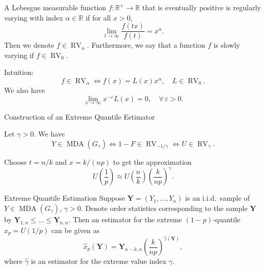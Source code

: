 \documentclass[11pt, aspectratio=169]{beamer}
\DeclareMathOperator{\mda}{MDA}
\DeclareMathOperator{\rv}{RV}
\begin{document}

\begin{frame}
  \begin{definition}
    A Lebesgue measurable function $f:\mathbb{R}^+\to\mathbb{R}$ that is
    eventually positive is regularly varying with index $\alpha\in\mathbb{R}$ if
    for all $x > 0$,
    \begin{equation*}
      \lim_{t\to\infty}\frac{f\left(tx\right)}{f\left(t\right)} = x^\alpha.
    \end{equation*}
    Then we denote $f\in \rv_\alpha$. Furthermore, we say that a function $f$ is
    slowly varying if $f\in \rv_0$.
  \end{definition}
  \pause
  Intuition:
  \begin{equation*}
    f\in\rv_\alpha \iff f(x) = L(x)x^{\alpha}, \quad L\in\rv_0.
  \end{equation*}
  We also have
  \begin{equation*}
    \lim_{x\to\infty} x^{-\varepsilon} L(x) = 0, \quad\forall
    \, \varepsilon > 0.
  \end{equation*}
\end{frame}


\begin{frame}{Construction of an Extreme Quantile Estimator}
  \begin{theorem}
    Let $\gamma > 0$. We have
    \begin{equation*}
      Y\in\mda\left(G_\gamma\right) \iff 1-F\in \rv_{-1/\gamma}
      \iff U\in \rv_\gamma.
    \end{equation*}
    \pause
  \end{theorem}
  Choose $t=n/k$ and $x = k/(np)$ to get the approximation
    \begin{equation*}
      U\left(\frac{1}{p}\right)\approx U\left(\frac{n}{k}\right)
      \left(\frac{k}{np}\right)^{\gamma}.
    \end{equation*}
\end{frame}


\begin{frame}{Extreme Quantile Estimation}
  Suppose $\bm Y = \left(Y_1, \ldots, Y_n\right)$ is an i.i.d.\ sample of
  $Y\in\mda\left(G_\gamma\right)$, $\gamma > 0$. Denote order statistics
  corresponding to the sample $\bm Y$ by $\bm Y_{1, n} \leq \dots \leq \bm Y_{n,
  n}$. Then an estimator for the extreme $(1-p)$-quantile $x_{p} =
  U\left(1/p\right)$ can be given as
  \begin{equation*}
    \hat x_{p}\left(\bm Y\right) = \bm Y_{n-k,n}
    \left(\frac{k}{np}\right)^{\hat\gamma\left(\bm Y\right)},
  \end{equation*}
  where $\hat\gamma$ is an estimator for the extreme value index $\gamma$.
\end{frame}
\end{document}
